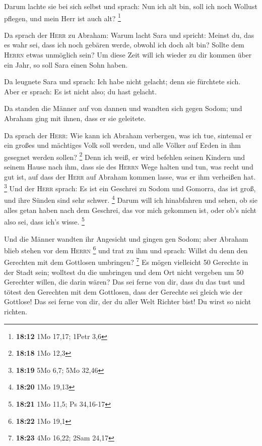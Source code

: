  Darum lachte sie bei sich selbst und sprach: Nun ich alt
bin, soll ich noch Wollust pflegen, und mein Herr ist auch alt?
\footnote{\textbf{18:12} 1Mo 17,17; 1Petr 3,6}

 Da sprach der \textsc{Herr} zu Abraham: Warum lacht Sara
und spricht: Meinst du, das es wahr sei, dass ich noch gebären werde,
obwohl ich doch alt bin?  Sollte dem \textsc{Herrn} etwas
unmöglich sein? Um diese Zeit will ich wieder zu dir kommen über ein
Jahr, so soll Sara einen Sohn haben.

 Da leugnete Sara und sprach: Ich habe nicht gelacht;
denn sie fürchtete sich. Aber er sprach: Es ist nicht also; du hast
gelacht.

 Da standen die Männer auf von dannen und wandten sich
gegen Sodom; und Abraham ging mit ihnen, dass er sie geleitete.

 Da sprach der \textsc{Herr}: Wie kann ich Abraham
verbergen, was ich tue,  sintemal er ein großes und
mächtiges Volk soll werden, und alle Völker auf Erden in ihm gesegnet
werden sollen? \footnote{\textbf{18:18} 1Mo 12,3}  Denn
ich weiß, er wird befehlen seinen Kindern und seinem Hause nach ihm,
dass sie des \textsc{Herrn} Wege halten und tun, was recht und gut ist,
auf dass der \textsc{Herr} auf Abraham kommen lasse, was er ihm
verheißen hat. \footnote{\textbf{18:19} 5Mo 6,7; 5Mo 32,46}
 Und der \textsc{Herr} sprach: Es ist ein Geschrei zu
Sodom und Gomorra, das ist groß, und ihre Sünden sind sehr schwer.
\footnote{\textbf{18:20} 1Mo 19,13}  Darum will ich
hinabfahren und sehen, ob sie alles getan haben nach dem Geschrei, das
vor mich gekommen ist, oder ob's nicht also sei, dass ich's wisse.
\footnote{\textbf{18:21} 1Mo 11,5; Ps 34,16-17}

 Und die Männer wandten ihr Angesicht und gingen gen
Sodom; aber Abraham blieb stehen vor dem \textsc{Herrn} \footnote{\textbf{18:22}
  1Mo 19,1}  und trat zu ihm und sprach: Willst du denn
den Gerechten mit dem Gottlosen umbringen? \footnote{\textbf{18:23} 4Mo
  16,22; 2Sam 24,17}  Es mögen vielleicht 50 Gerechte in
der Stadt sein; wolltest du die umbringen und dem Ort nicht vergeben um
50 Gerechter willen, die darin wären?  Das sei ferne von
dir, dass du das tust und tötest den Gerechten mit dem Gottlosen, dass
der Gerechte sei gleich wie der Gottlose! Das sei ferne von dir, der du
aller Welt Richter bist! Du wirst so nicht richten.

